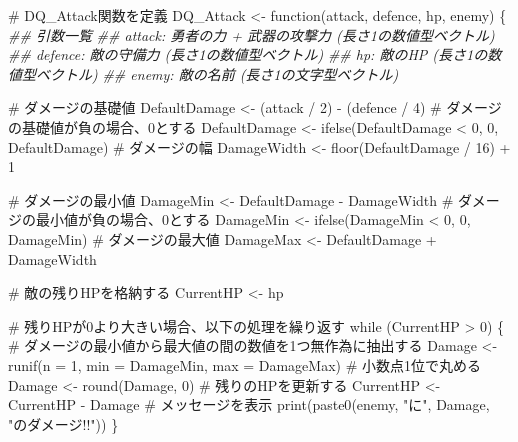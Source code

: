 \documentclass[
  a4paper,
  pandoc,
  ja=standard,
  jafont=haranoaji]{bxjsbook}
\newenvironment{Shaded}{\begin{snugshade}}{\end{snugshade}}
\newcommand{\AttributeTok}[1]{\textcolor[rgb]{0.00,0.48,0.65}{#1}}
\newcommand{\CommentTok}[1]{\textcolor[rgb]{0.37,0.37,0.37}{#1}}
\newcommand{\ControlFlowTok}[1]{\textcolor[rgb]{0.00,0.48,0.65}{#1}}
\newcommand{\DecValTok}[1]{\textcolor[rgb]{0.68,0.00,0.00}{#1}}
\newcommand{\DocumentationTok}[1]{\textcolor[rgb]{0.37,0.37,0.37}{\textit{#1}}}
\newcommand{\FunctionTok}[1]{\textcolor[rgb]{0.28,0.35,0.67}{#1}}
\newcommand{\NormalTok}[1]{\textcolor[rgb]{0.00,0.48,0.65}{#1}}
\newcommand{\OtherTok}[1]{\textcolor[rgb]{0.00,0.48,0.65}{#1}}
\newcommand{\SpecialCharTok}[1]{\textcolor[rgb]{0.37,0.37,0.37}{#1}}
\newcommand{\StringTok}[1]{\textcolor[rgb]{0.13,0.47,0.30}{#1}}
\begin{document}
\begin{Shaded}
\begin{Highlighting}[numbers=left,,]
\CommentTok{\# DQ\_Attack関数を定義}
\NormalTok{DQ\_Attack }\OtherTok{\textless{}{-}} \ControlFlowTok{function}\NormalTok{(attack, defence, hp, enemy) \{}
  \DocumentationTok{\#\# 引数一覧}
  \DocumentationTok{\#\# attack: 勇者の力 + 武器の攻撃力 (長さ1の数値型ベクトル)}
  \DocumentationTok{\#\# defence: 敵の守備力 (長さ1の数値型ベクトル)}
  \DocumentationTok{\#\# hp: 敵のHP (長さ1の数値型ベクトル)}
  \DocumentationTok{\#\# enemy: 敵の名前 (長さ1の文字型ベクトル)}
  
  \CommentTok{\# ダメージの基礎値}
\NormalTok{  DefaultDamage }\OtherTok{\textless{}{-}}\NormalTok{ (attack }\SpecialCharTok{/} \DecValTok{2}\NormalTok{) }\SpecialCharTok{{-}}\NormalTok{ (defence }\SpecialCharTok{/} \DecValTok{4}\NormalTok{)}
  \CommentTok{\# ダメージの基礎値が負の場合、0とする}
\NormalTok{  DefaultDamage }\OtherTok{\textless{}{-}} \FunctionTok{ifelse}\NormalTok{(DefaultDamage }\SpecialCharTok{\textless{}} \DecValTok{0}\NormalTok{, }\DecValTok{0}\NormalTok{, DefaultDamage)}
  \CommentTok{\# ダメージの幅}
\NormalTok{  DamageWidth   }\OtherTok{\textless{}{-}} \FunctionTok{floor}\NormalTok{(DefaultDamage }\SpecialCharTok{/} \DecValTok{16}\NormalTok{) }\SpecialCharTok{+} \DecValTok{1}
  
  \CommentTok{\# ダメージの最小値}
\NormalTok{  DamageMin     }\OtherTok{\textless{}{-}}\NormalTok{ DefaultDamage }\SpecialCharTok{{-}}\NormalTok{ DamageWidth}
  \CommentTok{\# ダメージの最小値が負の場合、0とする}
\NormalTok{  DamageMin     }\OtherTok{\textless{}{-}} \FunctionTok{ifelse}\NormalTok{(DamageMin }\SpecialCharTok{\textless{}} \DecValTok{0}\NormalTok{, }\DecValTok{0}\NormalTok{, DamageMin)}
  \CommentTok{\# ダメージの最大値}
\NormalTok{  DamageMax     }\OtherTok{\textless{}{-}}\NormalTok{ DefaultDamage }\SpecialCharTok{+}\NormalTok{ DamageWidth}
  
  \CommentTok{\# 敵の残りHPを格納する}
\NormalTok{  CurrentHP     }\OtherTok{\textless{}{-}}\NormalTok{ hp}
  
  \CommentTok{\# 残りHPが0より大きい場合、以下の処理を繰り返す}
  \ControlFlowTok{while}\NormalTok{ (CurrentHP }\SpecialCharTok{\textgreater{}} \DecValTok{0}\NormalTok{) \{}
    \CommentTok{\# ダメージの最小値から最大値の間の数値を1つ無作為に抽出する}
\NormalTok{    Damage }\OtherTok{\textless{}{-}} \FunctionTok{runif}\NormalTok{(}\AttributeTok{n =} \DecValTok{1}\NormalTok{, }\AttributeTok{min =}\NormalTok{ DamageMin, }\AttributeTok{max =}\NormalTok{ DamageMax)}
    \CommentTok{\# 小数点1位で丸める}
\NormalTok{    Damage }\OtherTok{\textless{}{-}} \FunctionTok{round}\NormalTok{(Damage, }\DecValTok{0}\NormalTok{)}
    \CommentTok{\# 残りのHPを更新する}
\NormalTok{    CurrentHP }\OtherTok{\textless{}{-}}\NormalTok{ CurrentHP }\SpecialCharTok{{-}}\NormalTok{ Damage}
    \CommentTok{\# メッセージを表示}
    \FunctionTok{print}\NormalTok{(}\FunctionTok{paste0}\NormalTok{(enemy, }\StringTok{"に"}\NormalTok{, Damage, }\StringTok{"のダメージ!!"}\NormalTok{))}
\NormalTok{  \}}
  

\end{Highlighting}
\end{Shaded}
\end{document}
